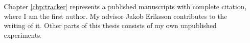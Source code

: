 \authorcontributions



Chapter \ref{chp:tracker} represents a published manuscripts with complete citation, where I am the first author.
My advisor Jakob Eriksson contributes to the writing of it.
Other parts of this thesis consists of my own unpublished experiments.